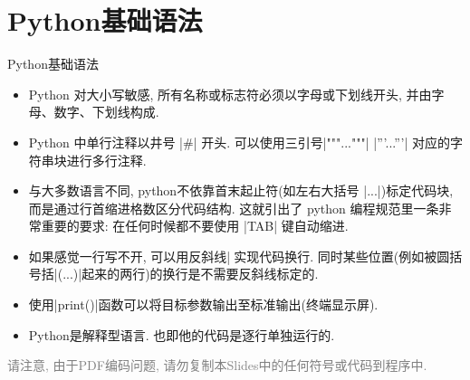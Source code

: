 \documentclass{beamer}
\begin{document}
  \section{Python基础语法}
    \begin{frame}[fragile]{Python基础语法}
      \begin{block}{}
        \begin{itemize}
          \item Python 对大小写敏感, 所有名称或标志符必须以字母或下划线开头, 并由字母、数字、下划线构成.
          \item Python 中单行注释以井号 \cverb|#| 开头. 可以使用三引号\cverb|"""..."""| \cverb|'''...'''| 对应的字符串块进行多行注释.
          \item 与大多数语言不同, python不依靠首末起止符(如左右大括号 \cverb|{...}|)标定代码块, 而是通过行首缩进格数区分代码结构. 这就引出了 python 编程规范里一条非常重要的要求: 在任何时候都不要使用 \cverb|TAB| 键自动缩进.
          \item 如果感觉一行写不开, 可以用反斜线\cverb|\| 来实现代码换行. 同时某些位置(例如被圆括号括\cverb|(...)|起来的两行)的换行是不需要反斜线标定的.
          \item 使用\cverb|print()|函数可以将目标参数输出至标准输出(终端显示屏).
          \item Python是解释型语言. 也即他的代码是逐行单独运行的.
        \end{itemize}
      \end{block}
      \textcolor{gray}{\small 请注意, 由于PDF编码问题, 请勿复制本Slides中的任何符号或代码到程序中.}
    \end{frame}
\end{document}
